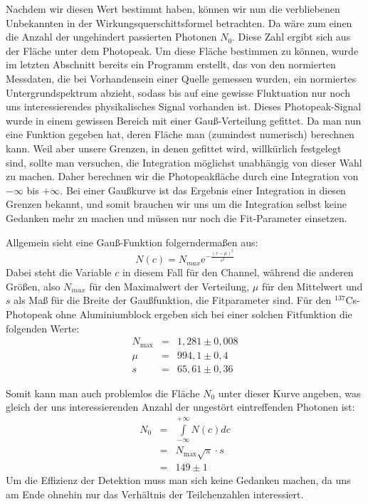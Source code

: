 Nachdem wir diesen Wert bestimmt haben, können wir nun die verbliebenen
Unbekannten in der Wirkungsquerschittsformel betrachten. Da wäre zum einen die
Anzahl der ungehindert passierten Photonen $N_0$. Diese Zahl ergibt sich aus
der Fläche unter dem Photopeak. Um diese Fläche bestimmen zu können, wurde im
letzten Abschnitt bereits ein Programm erstellt, das von den normierten
Messdaten, die bei Vorhandensein einer Quelle gemessen wurden, ein normiertes
Untergrundspektrum abzieht, sodass bis auf eine gewisse Fluktuation nur noch
uns interessierendes physikalisches Signal vorhanden ist. Dieses
Photopeak-Signal wurde in einem gewissen Bereich mit einer Gauß-Verteilung
gefittet. Da man nun eine Funktion gegeben hat, deren Fläche man (zumindest
numerisch) berechnen kann. Weil aber unsere Grenzen, in denen gefittet
wird, willkürlich festgelegt sind, sollte man versuchen, die Integration
möglichst unabhängig von dieser Wahl zu machen. Daher berechnen wir die
Photopeakfläche durch eine Integration von $-\infty$ bis $+\infty$. Bei
einer Gaußkurve ist das Ergebnis einer Integration in diesen Grenzen bekannt,
und somit brauchen wir uns um die Integration selbst keine Gedanken mehr zu
machen und müssen nur noch die Fit-Parameter einsetzen.

Allgemein sieht eine Gauß-Funktion folgerndermaßen aus:
\begin{equation}
  N(c) = N_{max}\mathrm e^{-\frac{(c-\mu)^2}{s^2}}
\end{equation}
Dabei steht die Variable $c$ in diesem Fall für den Channel, während die
anderen Größen, also $N_{max}$ für den Maximalwert der Verteilung, $\mu$ für den
Mittelwert und $s$ als Maß für die Breite der Gaußfunktion, die Fitparameter
sind. Für den $^{137}$Cs-Photopeak ohne Aluminiumblock ergeben sich bei einer
solchen Fitfunktion die folgenden Werte:
\begin{eqnarray}
N_{\mathrm{max}} &=& 1,281 \pm 0,008\\
\mu &=& 994,1 \pm 0,4\\
s &=& 65,61 \pm 0,36
\end{eqnarray}

Somit kann man auch problemlos die Fläche $N_0$ unter dieser Kurve
angeben, was gleich der uns interessierenden Anzahl der ungestört eintreffenden
Photonen ist:
\begin{eqnarray}
N_0 &=& \int\limits_{-\infty}^{+\infty}N(c)dc\\
&=& N_{\mathrm{max}}\sqrt{\pi}\cdot s\\
\nonumber &=& 149 \pm 1
\end{eqnarray}
Um die Effizienz der Detektion muss man sich keine Gedanken machen, da uns am
Ende ohnehin nur das Verhältnis der Teilchenzahlen interessiert.

